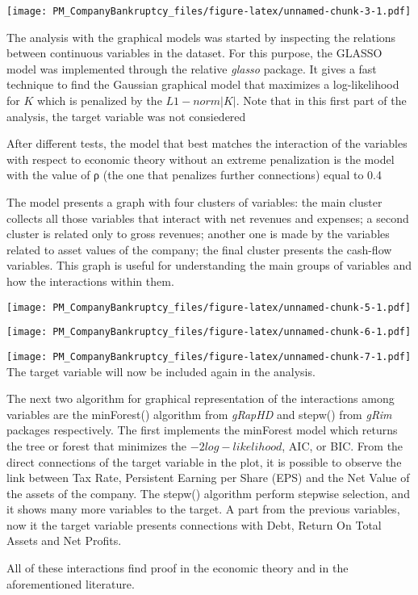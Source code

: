 \documentclass[
]{article}
\begin{document}
\texttt{[image: PM\_CompanyBankruptcy\_files/figure-latex/unnamed-chunk-3-1.pdf]}

The analysis with the graphical models was started by inspecting the
relations between continuous variables in the dataset. For this purpose,
the GLASSO model was implemented through the relative \emph{glasso}
package. It gives a fast technique to find the Gaussian graphical model
that maximizes a log-likelihood for \(K\) which is penalized by the
\(L1 − norm |K|\). Note that in this first part of the analysis, the
target variable was not consiedered

After different tests, the model that best matches the interaction of
the variables with respect to economic theory without an extreme
penalization is the model with the value of ρ (the one that penalizes
further connections) equal to 0.4

The model presents a graph with four clusters of variables: the main
cluster collects all those variables that interact with net revenues and
expenses; a second cluster is related only to gross revenues; another
one is made by the variables related to asset values of the company; the
final cluster presents the cash-flow variables. This graph is useful for
understanding the main groups of variables and how the interactions
within them.

\texttt{[image: PM\_CompanyBankruptcy\_files/figure-latex/unnamed-chunk-5-1.pdf]}

\texttt{[image: PM\_CompanyBankruptcy\_files/figure-latex/unnamed-chunk-6-1.pdf]}

\texttt{[image: PM\_CompanyBankruptcy\_files/figure-latex/unnamed-chunk-7-1.pdf]}
The target variable will now be included again in the analysis.

The next two algorithm for graphical representation of the interactions
among variables are the minForest() algorithm from \emph{gRapHD} and
stepw() from \emph{gRim} packages respectively. The first implements the
minForest model which returns the tree or forest that minimizes the
\(-2log-likelihood\), AIC, or BIC. From the direct connections of the
target variable in the plot, it is possible to observe the link between
Tax Rate, Persistent Earning per Share (EPS) and the Net Value of the
assets of the company. The stepw() algorithm perform stepwise selection,
and it shows many more variables to the target. A part from the previous
variables, now it the target variable presents connections with Debt,
Return On Total Assets and Net Profits.

All of these interactions find proof in the economic theory and in the
aforementioned literature.
\end{document}
